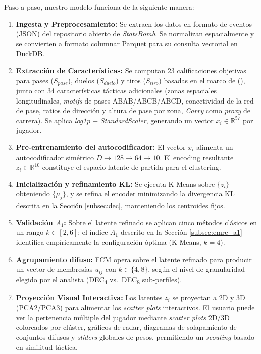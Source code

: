 \documentclass[conference]{IEEEtran}
\begin{document}
Paso a paso, nuestro modelo funciona de la siguiente manera:
\begin{enumerate}
    \item \textbf{Ingesta y Preprocesamiento:} Se extraen los datos en formato de eventos (JSON) del repositorio abierto de \textit{StatsBomb}. Se normalizan espacialmente y se convierten a formato columnar Parquet para su consulta vectorial en DuckDB.
    \item \textbf{Extracción de Características:} Se computan 23 calificaciones objetivas para pases ($S_{pase}$), duelos ($S_{duelo}$) y tiros ($S_{tiro}$) basadas en el marco de \citeauthor{evers2024visual} (\citeyear{evers2024visual}), junto con 34 características tácticas adicionales (zonas espaciales longitudinales, \textit{motifs} de pases ABAB/ABCB/ABCD, conectividad de la red de pase, ratios de dirección y altura de pase por zona, \textit{Carry} como \textit{proxy} de carrera). Se aplica \textit{log1p} + \textit{StandardScaler}, generando un vector $x_i \in \mathbb{R}^{57}$ por jugador.
    \item \textbf{Pre-entrenamiento del autocodificador:} El vector $x_i$ alimenta un autocodificador simétrico $D \rightarrow 128 \rightarrow 64 \rightarrow 10$. El encoding resultante $z_i \in \mathbb{R}^{10}$ constituye el espacio latente de partida para el clustering.
    \item \textbf{Inicialización y refinamiento KL:} Se ejecuta K-Means sobre $\{z_i\}$ obteniendo $\{\mu_j\}$, y se refina el encoder minimizando la divergencia KL descrita en la Sección \ref{subsec:dec}, manteniendo los centroides fijos.
    \item \textbf{Validación $A_1$:} Sobre el latente refinado se aplican cinco métodos clásicos en un rango $k \in [2, 6]$; el índice $A_1$ descrito en la Sección \ref{subsec:emre_a1} identifica empíricamente la configuración óptima (K-Means, $k=4$).
    \item \textbf{Agrupamiento difuso:} FCM opera sobre el latente refinado para producir un vector de membresías $u_{ij}$ con $k \in \{4, 8\}$, según el nivel de granularidad elegido por el analista (DEC\textsubscript{4} vs.\ DEC\textsubscript{8} sub-perfiles).
    \item \textbf{Proyección Visual Interactiva:} Los latentes $z_i$ se proyectan a 2D y 3D (PCA2/PCA3) para alimentar los \textit{scatter plots} interactivos. El usuario puede ver la pertenencia múltiple del jugador mediante \textit{scatter plots} 2D/3D coloreados por clúster, gráficos de radar, diagramas de solapamiento de conjuntos difusos y \textit{sliders} globales de pesos, permitiendo un \textit{scouting} basado en similitud táctica.
\end{enumerate}
\end{document}
